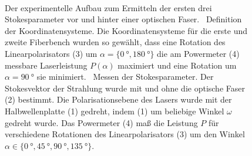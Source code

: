\documentclass[a4paper,12pt,twoside,parskip=no,headsepline,open=right,ngerman,export]{scrreprt}
\begin{document}
            \begin{figure}[!b]
                \centering
                 \\
                \caption[Messen von Stokesparametern]{Der experimentelle Aufbau zum Ermitteln der ersten drei Stokesparameter vor und hinter einer optischen Faser. ~Definition der Koordinatensysteme. Die Koordinatensysteme für die erste und zweite Fiberbench wurden so gewählt, dass eine Rotation des Linearpolarisators (3) um $\alpha = \{\SI{0}{\degree}, \SI{180}{\degree}\}$ die am Powermeter (4) messbare Laserleistung $P(\alpha)$ maximiert und eine Rotation um $\alpha = \SI{90}{\degree}$ sie minimiert.
                ~Messen der Stokesparameter. Der Stokesvektor der Strahlung wurde mit und ohne die optische Faser (2) bestimmt. Die Polarisationsebene des Lasers wurde mit der Halbwellenplatte (1) gedreht, indem (1) um beliebige Winkel $\omega$ gedreht wurde. Das Powermeter (4) maß die Leistung $P$ für verschiedene Rotationen des Linearpolarisators (3) um den Winkel $\alpha \in \{\SI{0}{\degree}, \SI{45}{\degree}, \SI{90}{\degree}, \SI{135}{\degree}\}$.}
                \label{fig:method_stokesFaser}
            \end{figure}
            
\end{document}
